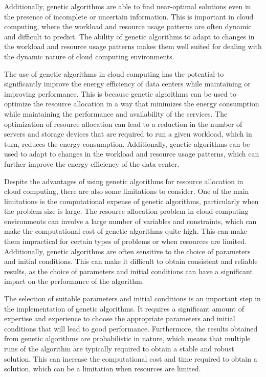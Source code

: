Additionally, genetic algorithms are able to find near-optimal solutions even in the presence of incomplete or uncertain information. This is important in cloud computing, where the workload and resource usage patterns are often dynamic and difficult to predict. The ability of genetic algorithms to adapt to changes in the workload and resource usage patterns makes them well suited for dealing with the dynamic nature of cloud computing environments.

The use of genetic algorithms in cloud computing has the potential to significantly improve the energy efficiency of data centers while maintaining or improving performance. This is because genetic algorithms can be used to optimize the resource allocation in a way that minimizes the energy consumption while maintaining the performance and availability of the services. The optimization of resource allocation can lead to a reduction in the number of servers and storage devices that are required to run a given workload, which in turn, reduces the energy consumption. Additionally, genetic algorithms can be used to adapt to changes in the workload and resource usage patterns, which can further improve the energy efficiency of the data center.

Despite the advantages of using genetic algorithms for resource allocation in cloud computing, there are also some limitations to consider. One of the main limitations is the computational expense of genetic algorithms, particularly when the problem size is large. The resource allocation problem in cloud computing environments can involve a large number of variables and constraints, which can make the computational cost of genetic algorithms quite high. This can make them impractical for certain types of problems or when resources are limited. Additionally, genetic algorithms are often sensitive to the choice of parameters and initial conditions. This can make it difficult to obtain consistent and reliable results, as the choice of parameters and initial conditions can have a significant impact on the performance of the algorithm.

The selection of suitable parameters and initial conditions is an important step in the implementation of genetic algorithms. It requires a significant amount of expertise and experience to choose the appropriate parameters and initial conditions that will lead to good performance. Furthermore, the results obtained from genetic algorithms are probabilistic in nature, which means that multiple runs of the algorithm are typically required to obtain a stable and robust solution. This can increase the computational cost and time required to obtain a solution, which can be a limitation when resources are limited.


